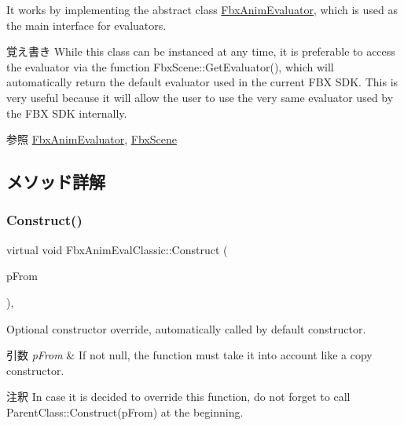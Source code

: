 It works by implementing the abstract class \hyperlink{class_fbx_anim_evaluator}{Fbx\+Anim\+Evaluator}, which is used as the main interface for evaluators. \begin{DoxyNote}{覚え書き}
While this class can be instanced at any time, it is preferable to access the evaluator via the function Fbx\+Scene\+::\+Get\+Evaluator(), which will automatically return the default evaluator used in the current F\+BX S\+DK. This is very useful because it will allow the user to use the very same evaluator used by the F\+BX S\+DK internally. 
\end{DoxyNote}
\begin{DoxySeeAlso}{参照}
\hyperlink{class_fbx_anim_evaluator}{Fbx\+Anim\+Evaluator}, \hyperlink{class_fbx_scene}{Fbx\+Scene} 
\end{DoxySeeAlso}


\subsection{メソッド詳解}
\mbox{\label{class_fbx_anim_eval_classic_a9b0ca916c170485271aa2ba23d38019a}} 
\subsubsection{\texorpdfstring{Construct()}{Construct()}}
{\footnotesize\ttfamily virtual void Fbx\+Anim\+Eval\+Classic\+::\+Construct (\begin{DoxyParamCaption}\item[{const \hyperlink{class_fbx_object}{Fbx\+Object} $\ast$}]{p\+From }\end{DoxyParamCaption})\hspace{0.3cm}{\ttfamily [protected]}, {\ttfamily [virtual]}}

Optional constructor override, automatically called by default constructor. 
\begin{DoxyParams}{引数}
{\em p\+From} & If not null, the function must take it into account like a copy constructor. \\
\hline
\end{DoxyParams}
\begin{DoxyRemark}{注釈}
In case it is decided to override this function, do not forget to call Parent\+Class\+::\+Construct(p\+From) at the beginning. 
\end{DoxyRemark}



